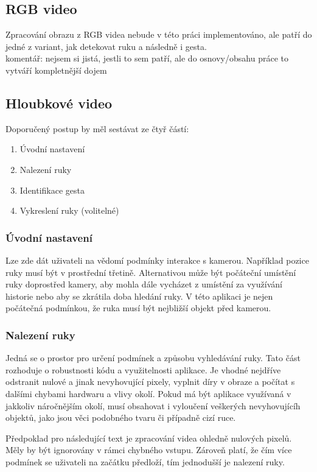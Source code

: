 \subsection{RGB video}
Zpracování obrazu z RGB videa nebude v této práci implementováno, ale patří do jedné z variant, jak detekovat ruku a následně i gesta.\\
komentář: nejsem si jistá, jestli to sem patří, ale do osnovy/obsahu práce to vytváří kompletnější dojem

\subsection{Hloubkové video}
Doporučený postup by měl sestávat ze čtyř částí:

\begin{enumerate}
\item Úvodní nastavení
\item Nalezení ruky
\item Identifikace gesta
\item Vykreslení ruky (volitelné)
\end{enumerate}

\subsubsection{Úvodní nastavení}
Lze zde dát uživateli na vědomí podmínky interakce s kamerou. Například pozice ruky musí být v prostřední třetině. Alternativou může být počáteční umístění ruky doprostřed kamery, aby mohla dále vycházet z umístění za využívání historie nebo aby se zkrátila doba hledání ruky. V této aplikaci je nejen počátečná podmínkou, že ruka musí být nejbližší objekt před kamerou.

\subsubsection{Nalezení ruky}
Jedná se o prostor pro určení podmínek a způsobu vyhledávání ruky. Tato část rozhoduje o robustnosti kódu a využitelnosti aplikace. Je vhodné nejdříve odstranit nulové a jinak nevyhovující pixely, vyplnit díry v obraze a počítat s dalšími chybami hardwaru a vlivy okolí. Pokud má být aplikace využívaná v jakkoliv náročnějším okolí, musí obsahovat i vyloučení veškerých nevyhovujícíh objektů, jako jsou věci podobného tvaru či případně cizí ruce.

Předpoklad pro následující text je zpracování videa ohledně nulových pixelů. Měly by být ignorovány v rámci chybného vstupu. Zároveň platí, že čím více podmínek se uživateli na začátku předloží, tím jednodušší je nalezení ruky. 

